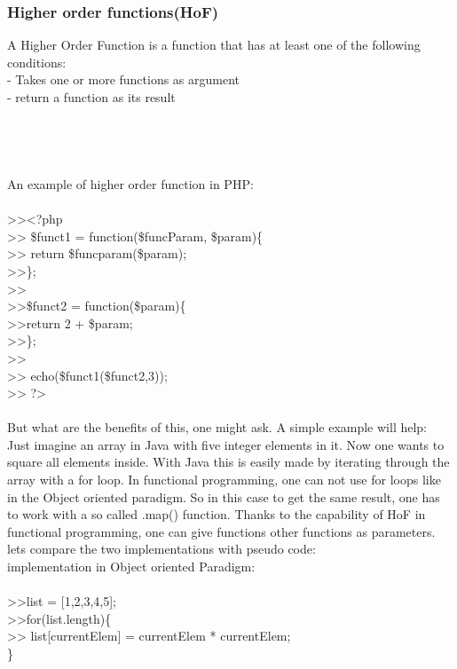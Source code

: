 \subsubsection{Higher order functions(HoF)}
A Higher Order Function is a function that has at least one of the following conditions:\\
- Takes one or more functions as argument\\
- return a function as its result\\\\\\\\\\
An example of higher order function in PHP:\\\\
>><?php\\
>> \$funct1 = function(\$funcParam, \$param)\{\\
>>  \tab return \$funcparam(\$param);\\
>>\};\\
>>\\
>>\$funct2 = function(\$param)\{\\
>>\tab return 2 + \$param;\\
>>\};\\
>>\\
>> echo(\$funct1(\$funct2,3));\\
>> ?>\\\\
But what are the benefits of this, one might ask. A simple example will help:\\
Just imagine an array in Java with five integer elements in it. Now one wants to square all elements inside. With Java this is easily made by iterating through the array with a for loop. In functional programming, one can not use for loops like in the Object oriented paradigm. So in this case to get the same result, one has to work with a so called .map() function. Thanks to the capability of HoF in functional programming, one can give functions other functions as parameters. lets compare the two implementations with pseudo code:\\
implementation in Object oriented Paradigm:\\\\
>>list = [1,2,3,4,5];\\
>>for(list.length)\{\\
>> \tab list[currentElem] = currentElem * currentElem;\\
\}\\\\
